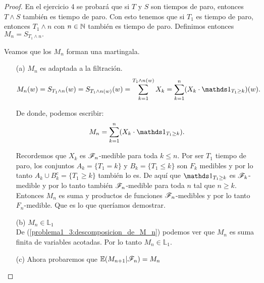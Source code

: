 \begin{proof}
		En el ejercicio 4 se probará que si ${T}$ y ${S}$ son tiempos de paro, entonces ${T\wedge S}$ también 
		es tiempo de paro. Con esto tenemos que si ${T_1}$ es tiempo de paro, entonces ${T_1 \wedge n}$ con 
		${n \in \mathbb{N}}$ también es tiempo de paro. Definimos entonces ${M_n = S_{T_1 \wedge n}.}$
		
		Veamos que los ${M_n}$ forman una martingala.
		
		\begin{itemize}
			\item[(a)] 
				${M_n}$ es adaptada a la filtración.
				\begin{align}
					M_n(w) = S_{T_1 \wedge n}(w) = 
					S_{T_1 \wedge n (w)}(w) = 
					\sum_{k=1}^{T_1 \wedge n (w)} X_k = 
					\sum_{k=1}^{n} (X_k \cdot \indic_{T_1 \geq k})(w).
				\end{align}
				
				De donde, podemos escribir:
				\begin{align}\label{problema1_3:descomposicion_de_M_n}
					M_n = \sum_{k=1}^{n} (X_k \cdot \indic_{T_1 \geq k}).
				\end{align}								 		
				
				Recordemos que ${X_k}$ es ${\mathscr{F}_n}$-medible para toda ${k \leq n }$. Por ser
				${T_1}$ tiempo de paro, los conjuntos ${A_k = \{T_1 = k\}}$ y 
				${B_k = \{T_1 \leq k\}}$	son ${F_k}$ medibles y por lo tanto 
				${A_k \cup B_k^c = \{ T_1 \geq k\}}$ también lo es. De aquí que 
				${\indic_{T_1 \geq k}}$ es ${\mathscr{F}_k}$-medible y por lo tanto también ${\mathscr{F}_n}$-medible
				para toda ${n}$ tal que ${n \geq k}$.\\
				  
				Entonces ${M_n}$ es suma y productos de funciones ${\mathscr{F}_n}$-medibles y por lo tanto
				${F_n}$-medible. Que es lo que queríamos demostrar.\\
				
			\item[(b)]
				${M_n \in \mathbb{L}_1}$\\
				
				De (\ref{problema1_3:descomposicion_de_M_n}) podemos ver que ${M_n}$ es 
				suma finita de variables acotadas. Por lo tanto ${M_n \in \mathbb{L}_1}$.\\
				
			\item[(c)] Ahora probaremos que	${\mathbb{E}(M_{n+1} | \mathscr{F}_{n}) = M_{n}}$\\
				

\end{itemize}
\end{proof}
